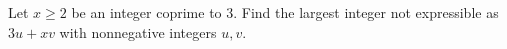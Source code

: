 Let $x\ge2$ be an integer coprime to 3. Find the largest integer not expressible as $3u+xv$ with nonnegative integers $u,v$.
